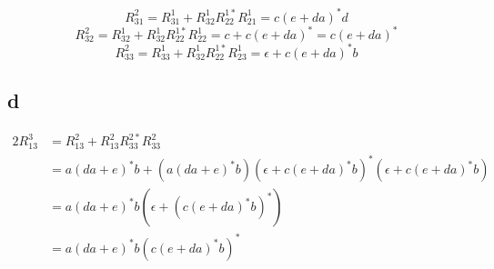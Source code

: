 \documentclass{ctexart}
\begin{document}
\[R_{31}^2 = R_{31}^1 +R_{32}^1R_{22}^{1*}R_{21}^1 = c(e+da)^*d  \]
\[R_{32}^2 = R_{32}^1 +R_{32}^1R_{22}^{1*}R_{22}^1 = c+c(e+da)^*=c(e+da)^*  \]
\[R_{33}^2 = R_{33}^1 +R_{32}^1R_{22}^{1*}R_{23}^1 = \epsilon+c(e+da)^*b  \]

\subsection{d}
\begin{alignat*}{2}
	R_{13}^3&=R_{13}^2+R_{13}^2R_{33}^{2*}R_{33}^2\\
	&=a(da+e)^*b+(a(da+e)^*b)(\epsilon+c(e+da)^*b)^*(\epsilon+c(e+da)^*b)\\
	&=a(da+e)^*b(\epsilon+(c(e+da)^*b)^*)\\
	&=a(da+e)^*b(c(e+da)^*b)^*
\end{alignat*}
\end{document}
